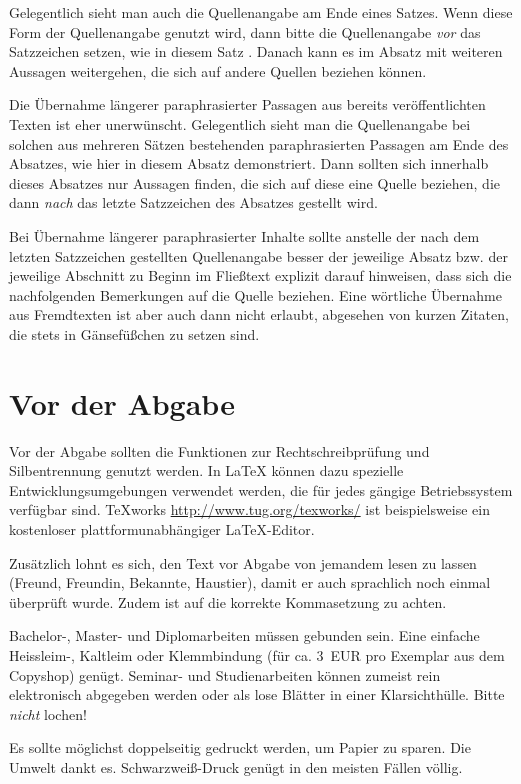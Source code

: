 \documentclass[
    fontsize=12pt,
    headings=small,
    parskip=half,           %
    bibliography=totoc,
    numbers=noenddot,       %
    open=any,               %
    ]{scrreprt}
\begin{document}
Gelegentlich sieht man auch die Quellenangabe am Ende eines Satzes. Wenn diese Form der Quellenangabe genutzt wird, dann bitte die Quellenangabe \emph{vor} das Satzzeichen setzen, wie in diesem Satz \cite{XYZ}. Danach kann es im Absatz mit weiteren Aussagen weitergehen, die sich auf andere Quellen beziehen können.

Die Übernahme längerer paraphrasierter Passagen aus bereits veröffentlichten Texten ist eher unerwünscht. Gelegentlich sieht man die Quellenangabe bei solchen aus mehreren Sätzen bestehenden paraphrasierten Passagen am Ende des Absatzes, wie hier in diesem Absatz demonstriert. Dann sollten sich innerhalb dieses Absatzes nur Aussagen finden, die sich auf diese eine Quelle beziehen, die dann \emph{nach} das letzte Satzzeichen des Absatzes gestellt wird. \cite{XYZ}

Bei Übernahme längerer paraphrasierter Inhalte sollte anstelle der nach dem letzten Satzzeichen gestellten Quellenangabe besser der jeweilige Absatz bzw. der jeweilige Abschnitt zu Beginn im Fließtext explizit darauf hinweisen, dass sich die nachfolgenden Bemerkungen auf die Quelle \cite{XYZ} beziehen. Eine wörtliche Übernahme aus Fremdtexten ist aber auch dann nicht erlaubt, abgesehen von kurzen Zitaten, die stets in Gänsefüßchen zu setzen sind.

\section{Vor der Abgabe}

Vor der Abgabe sollten die Funktionen zur Rechtschreibprüfung und Silbentrennung genutzt werden. In LaTeX können dazu spezielle Entwicklungsumgebungen verwendet werden, die für jedes gängige Betriebssystem verfügbar sind. TeXworks \url{http://www.tug.org/texworks/} ist beispielsweise ein kostenloser plattformunabhängiger LaTeX-Editor.

Zusätzlich lohnt es sich, den Text vor Abgabe von jemandem lesen zu lassen (Freund, Freundin, Bekannte, Haustier), damit er auch sprachlich noch einmal überprüft wurde. Zudem ist auf die korrekte Kommasetzung zu achten.

Bachelor-, Master- und Diplomarbeiten müssen gebunden sein. Eine einfache Heissleim-, Kaltleim oder Klemmbindung (für ca. 3~EUR pro Exemplar aus dem Copyshop) genügt. Seminar- und Studienarbeiten können zumeist rein elektronisch abgegeben werden oder als lose Blätter in einer Klarsichthülle. Bitte \emph{nicht} lochen!

Es sollte möglichst doppelseitig gedruckt werden, um Papier zu sparen. Die Umwelt dankt es. Schwarzweiß-Druck genügt in den meisten Fällen völlig.
\end{document}

